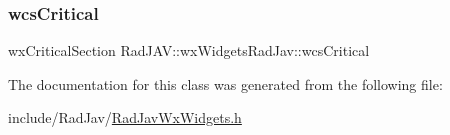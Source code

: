 \subsubsection{\texorpdfstring{wcs\+Critical}{wcsCritical}}
{\footnotesize\ttfamily wx\+Critical\+Section Rad\+J\+A\+V\+::wx\+Widgets\+Rad\+Jav\+::wcs\+Critical}



The documentation for this class was generated from the following file\+:\begin{DoxyCompactItemize}
\item 
include/\+Rad\+Jav/\mbox{\hyperlink{_rad_jav_wx_widgets_8h}{Rad\+Jav\+Wx\+Widgets.\+h}}\end{DoxyCompactItemize}
